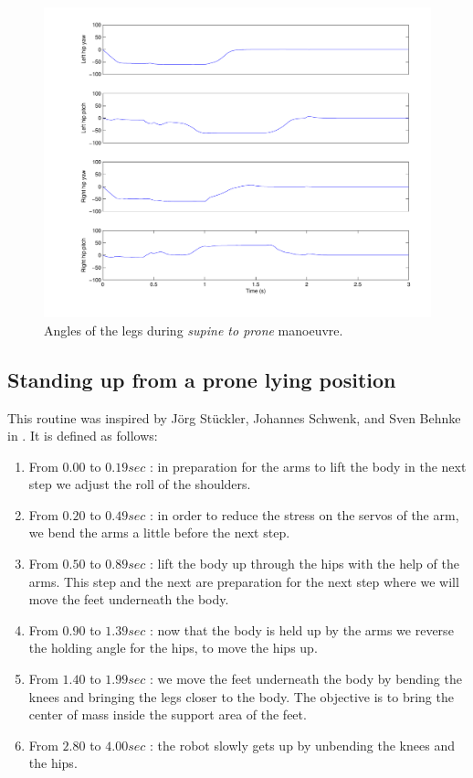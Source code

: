 \begin{figure}[htp]
\center
    \includegraphics[width = \textwidth]{figures/sup2proneLegs}
    \caption[Angles of the legs during \emph{supine to prone} manoeuvre]{Angles of the legs during \emph{supine to prone} manoeuvre.}
    \label{fig:sup2proneLegs}
\end{figure}

\subsection{Standing up from a prone lying position}
This routine was inspired by Jörg Stückler, Johannes Schwenk, and Sven Behnke in \cite{Stuckler06}. It is defined as follows:\begin{enumerate}
\item From $0.00$ to $0.19sec$ : in preparation for the arms to lift the body in the next step we adjust the roll of the shoulders.

\item From $0.20$ to $0.49sec$ : in order to reduce the stress on the servos of the arm, we bend the arms a little before the next step.

\item From $0.50$ to $0.89sec$ : lift the body up through the hips with the help of the arms. This step and the next are preparation for the next step where we will move the feet underneath the body.

\item From $0.90$ to $1.39sec$ : now that the body is held up by the arms we reverse the holding angle for the hips, to move the hips up. 

\item From $1.40$ to $1.99sec$ :  we move the feet underneath the body by bending the knees and bringing the legs closer to the body. The objective is to bring the center of mass inside the support area of the feet.

\item From $2.80$ to $4.00sec$ : the robot slowly gets up by unbending the knees and the hips. 
\end{enumerate}

